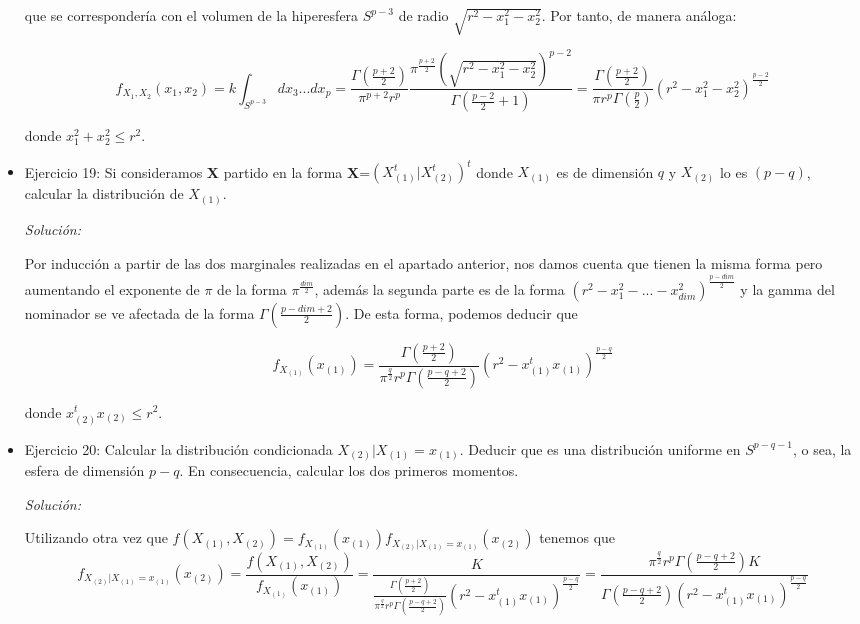 \documentclass{article}
\theoremstyle{theorem-style}  %
\theoremstyle{definition}
\theoremstyle{example-style}
\begin{document}
\begin{itemize}
		que se correspondería con el volumen de la hiperesfera $S^{p-3}$ de radio $\sqrt{r^2 - x_1^2 - x_2^2}$. Por tanto, de manera análoga:
		
		\[
				f_{X_1, X_2}(x_1, x_2) = k \int_{S^{p-3}} dx_3 ... dx_p = \frac{\Gamma(\frac{p+2}{2})}{\pi^{p+2} r^p} \frac{\pi^{\frac{p+2}{2}}  (\sqrt{r^2 - x_1^2 - x_2 ^2})^{p-2} }{ \Gamma(\frac{p-2}{2} + 1)} = \frac{\Gamma(\frac{p+2}{2})}{\pi r^p \Gamma(\frac{p}{2})} (r^2 - x_1^2 - x_2 ^ 2) ^{\frac{p-2}{2}}
		\]
		
		donde $x_1^2 + x_2^2 \leq r^2$.
		
		\item Ejercicio 19: Si consideramos \textbf{X} partido en la forma \textbf{X}=$(X^t_{(1)}|X^t_{(2)})^t$ donde $X_{(1)}$ es de dimensión $q$ y $X_{(2)}$ lo es $(p-q)$, calcular la distribución de $X_{(1)}$.
		
		\textit{Solución: }
		
		Por inducción a partir de las dos marginales realizadas en el apartado anterior, nos damos cuenta que tienen la misma forma pero aumentando el exponente de $\pi$ de la forma $\pi^{\frac{dim}{2}}$, además la segunda parte es de la forma $(r^2 - x_1^2 - ... - x_{dim}^2)^{\frac{p-dim}{2}}$ y la gamma del nominador se ve afectada de la forma $\Gamma(\frac{p-dim+2}{2})$. De esta forma, podemos deducir que
		
		\[
			f_{X_{(1)}}(x_{(1)}) = \frac{\Gamma(\frac{p+2}{2})}{\pi^{\frac{q}{2}} r^p \Gamma(\frac{p-q+2}{2})} (r^2 -x_{(1)}^t x_{(1)}) ^{\frac{p-q}{2}}
		\] 
		
		donde $x_{(2)}^t x_{(2)} \leq r^2$.
		
		
		
		\item Ejercicio 20: Calcular la distribución condicionada $X_{(2)}|X_{(1)} = x_{(1)}$. Deducir que es una distribución uniforme en $S^{p-q-1}$, o sea, la esfera de dimensión $p-q$. En consecuencia, calcular los dos primeros momentos.
		
		\textit{Solución:}
		
		Utilizando otra vez que $f(X_{(1)}, X_{(2)}) = f_{X_{(1)}}(x_{(1)}) f_{X_{(2)}|X_{(1)} = x_{(1)}}(x_{(2)})$ tenemos que $$f_{X_{(2)}|X_{(1)} = x_{(1)}}(x_{(2)}) = \frac{f(X_{(1)}, X_{(2)}) }{f_{X_{(1)}}(x_{(1)})} = \frac{K}{\frac{\Gamma(\frac{p+2}{2})}{\pi^{\frac{q}{2}} r^p \Gamma(\frac{p-q+2}{2})} (r^2 -x_{(1)}^t x_{(1)}) ^{\frac{p-q}{2}}} = \frac{\pi^{\frac{q}{2}} r^p \Gamma(\frac{p-q+2}{2}) K }{\Gamma(\frac{p-q+2}{2}) (r^2 - x_{(1)}^tx_{(1)})^{\frac{p-q}{2}}} $$
		

\end{itemize}
\end{document}
